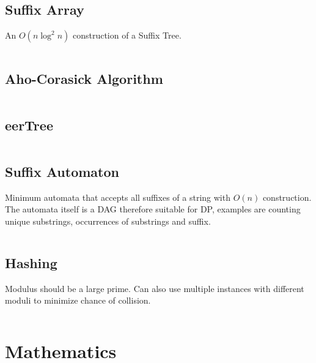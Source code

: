 \documentclass[8pt,a4paper,landscape,oneside]{amsart}
\newcommand{\code}[1]{\inputminted[fontsize=\normalsize,baselinestretch=1]{cpp}{_code/#1}}
\newif\ifverbose
\begin{document}
\begin{multicols*}{3}
    \ifverbose
    \subsection{Trie}
        A Trie class.
        \code{strings/trie.cpp}
    \fi

    \subsection{Suffix Array}
        An $O(n \log^2 n)$ construction of a Suffix Tree.
        \code{strings/suffix_array.cpp}

    \subsection{Aho-Corasick Algorithm}
        \ifverbose
        An implementation of the Aho-Corasick algorithm. Constructs a state
        machine from a set of keywords which can be used to search a string for
        any of the keywords.
        \fi
        \code{strings/aho_corasick.cpp}

    \subsection{eerTree}
        \ifverbose
        Constructs an eerTree in $O(n)$, one character at a time.
        \fi
        \code{strings/eertree.cpp}

    \subsection{Suffix Automaton}
        Minimum automata that accepts all suffixes of a string with $O(n)$
        construction. The automata itself is a DAG therefore suitable for DP,
        examples are counting unique substrings, occurrences of substrings and
        suffix.
        \code{strings/suffix_automaton.cpp}

    \subsection{Hashing}
        Modulus should be a large prime. Can also use multiple instances with
        different moduli to minimize chance of collision.
        \code{strings/hasher.cpp}

\section{Mathematics}
    \ifverbose

\end{multicols*}
\end{document}
